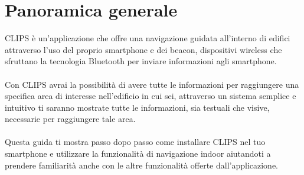 \documentclass[../ClipsManualeUtente.tex]{subfiles}
\begin{document}
\section{Panoramica generale}

	CLIPS è un'applicazione che offre una navigazione guidata all'interno di edifici attraverso l'uso del proprio smartphone e dei beacon, dispositivi wireless che sfruttano la tecnologia Bluetooth per inviare informazioni agli smartphone.
	\paragraph*{}
	Con CLIPS avrai la possibilità di avere tutte le informazioni per raggiungere una specifica area di interesse nell'edificio in cui sei, attraverso un sistema semplice e intuitivo ti saranno mostrate tutte le informazioni, sia testuali che visive, necessarie per raggiungere tale area.
	\paragraph*{}
	Questa guida ti mostra passo dopo passo come installare CLIPS nel tuo smartphone e utilizzare la funzionalità di navigazione indoor aiutandoti a prendere familiarità anche con le altre funzionalità offerte dall'applicazione.
	
	
\end{document}
